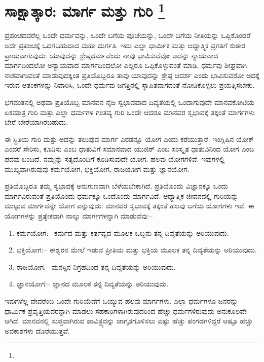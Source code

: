 
\chapter[ಸಾಕ್ಷಾತ್ಕಾರ: ಮಾರ್ಗ ಮತ್ತು ಗುರಿ ]{ಸಾಕ್ಷಾತ್ಕಾರ: ಮಾರ್ಗ ಮತ್ತು ಗುರಿ \protect\footnote{}}

ಪ್ರಪಂಚದವರೆಲ್ಲ ಒಂದೇ ಧರ್ಮವನ್ನು, ಒಂದೇ ಬಗೆಯ ಪೂಜೆಯನ್ನು, ಒಂದೇ ಬಗೆಯ ನೀತಿಯನ್ನು ಒಪ್ಪಿಕೊಂಡರೆ ಅದೇ ಪ್ರಪಂಚಕ್ಕೆ ಒದಗಬಹುದಾದ ಮಹಾ ದುರ್ಗತಿ. ಇದು ಎಲ್ಲಾ ಧಾರ್ಮಿಕ ಮತ್ತು ಆಧ್ಯಾತ್ಮಿಕ ಪ್ರಗತಿಗೆ ಕುಠಾರ ಪ್ರಾಯವಾಗುವುದು. ಯಾವುದನ್ನು ಶ್ರೇಷ್ಠಧರ್ಮವೆಂದು ನಾವು ಭಾವಿಸುವೆವೋ ಅದನ್ನು ನ್ಯಾಯವಾದ ಮಾರ್ಗದಿಂದಲೋ ಅನ್ಯಾಯವಾದ ಮಾರ್ಗದಿಂದಲೋ ಎಲ್ಲರೂ ಒಪ್ಪಿಕೊಳ್ಳುವಂತೆ ಮಾಡಿ, ಧರ್ಮವು ಶೀಘ್ರವಾಗಿ ನಾಶವಾಗುವಂತೆ ಮಾಡುವುದಕ್ಕಿಂತ ಪ್ರತಿಯೊಬ್ಬರೂ ತಾವು ಯಾವುದನ್ನು ಶ್ರೇಷ್ಠ ಆದರ್ಶ ಎಂದು ಭಾವಿಸುವರೋ ಅದಕ್ಕೆ ಇರುವ ಆತಂಕಗಳನ್ನು ನಿವಾರಿಸಿ, ಒಂದೇ ಧರ್ಮವು ಜಗತ್ತಿನಲ್ಲಿ ಸ್ಥಾಪಿತವಾಗದಂತೆ ನೋಡಿಕೊಳ್ಳಲು ಪ್ರಯತ್ನಿಸಬೇಕು.

ಭಗವಂತನಲ್ಲಿ ಅಥವಾ ಪ್ರತಿಯೊಬ್ಬ ಮಾನವನ ನೈಜ ಸ್ವಭಾವವಾದ ದಿವ್ಯತೆಯಲ್ಲಿ ಒಂದಾಗುವುದೇ ಮಾನವಕೋಟಿಯ ಏಕಮಾತ್ರ ಗುರಿ ಮತ್ತು ಎಲ್ಲಾ ಧರ್ಮಗಳ ಗಂತವ್ಯ ಗುರಿ ಒಂದೇ ಆದರೂ ಮಾನವರ ಸ್ವಭಾವಕ್ಕೆ ತಕ್ಕಂತೆ ಮಾರ್ಗಗಳು ಬೇರೆ ಬೇರೆಯಾಗಿರಬಹುದು.

ಈ ಸ್ಥಿತಿಯ ಗುರಿ ಮತ್ತು ಅದನ್ನು ತಲುಪುವ ಮಾರ್ಗ ಎರಡನ್ನೂ ಯೋಗ ಎಂದು ಕರೆಯುತ್ತಾರೆ. ಇಂಗ್ಲಿಷಿನ ಯೋಕ್​ ಎಂದರೆ ಸೇರಿಸು, ಕೂಡಿಸು ಎಂಬ ಧಾತುವಿಗೆ ಸಮಾನವಾದ ಯುಜಿರ್​ ಎಂಬ ಸಂಸ್ಕೃತ ಧಾತುವಿನಿಂದ ಯೋಗ ಎಂಬ ಪದವು ಬಂದಿದೆ. ನಮ್ಮನ್ನು ಸತ್ಯದೊಂದಿಗೆ ಕೂಡಿಸುವುದೇ ಯೋಗ. ಹಲವು ಯೋಗಗಳಿವೆ. ಇವುಗಳಲ್ಲಿ ಮುಖ್ಯವಾಗಿರುವುವು ಕರ್ಮಯೋಗ, ಭಕ್ತಿಯೋಗ, ರಾಜಯೋಗ ಮತ್ತು ಜ್ಞಾನಯೋಗ.

ಪ್ರತಿಯೊಬ್ಬರೂ ತಮ್ಮ ಸ್ವಭಾವಕ್ಕೆ ಅನುಗುಣವಾಗಿ ಬೆಳೆಯಬೇಕಾಗಿದೆ. ಪ್ರತಿಯೊಂದು ವಿಜ್ಞಾನಕ್ಕೂ ಒಂದು ಮಾರ್ಗವಿರುವಂತೆ ಪ್ರತಿಯೊಂದು ಧರ್ಮಕ್ಕೂ ಒಂದೊಂದು ಮಾರ್ಗವಿದೆ. ಆಧ್ಯಾತ್ಮಿಕ ಜೀವನದಲ್ಲಿ ಗುರಿಯನ್ನು ಮುಟ್ಟುವ ಮಾರ್ಗವನ್ನೇ ಯೋಗ ಎನ್ನುವುದು. ಮಾನವರ ಸ್ವಭಾವಕ್ಕೆ ತಕ್ಕಂತೆ ಹಲವು ಬಗೆಯ ಯೋಗಗಳು ಇವೆ. ಈ ಯೋಗಗಳನ್ನು ಪ್ರತ್ಯೇಕವಾಗಿ ನಾಲ್ಕು ಮಾರ್ಗಗಳನ್ನಾಗಿ ಮಾಡುವೆವು:–

\begin{enumerate}
\item ಕರ್ಮಯೋಗ:– ಕರ್ಮದ ಮತ್ತು ಕರ್ತವ್ಯದ ಮೂಲಕ ಒಬ್ಬನು ತನ್ನ ದಿವ್ಯತೆಯನ್ನು ಅರಿಯುವುದು.

 \item ಭಕ್ತಿಯೋಗ:– ಈಶ್ವರನ ಮೇಲೆ ಇಡುವ ಪ್ರೀತಿಯ ಮತ್ತು ಭಕ್ತಿಯ ಮೂಲಕ ತನ್ನ ದಿವ್ಯತೆಯನ್ನು ಅರಿಯುವುದು.

 \item ರಾಜಯೋಗ:– ಮನಸ್ಸಿನ ನಿಗ್ರಹದಿಂದ ತನ್ನ ದಿವ್ಯತೆಯನ್ನು ಅರಿಯುವುದು.

 \item ಜ್ಞಾನಯೋಗ:– ಜ್ಞಾನದ ಮೂಲಕ ತನ್ನ ದಿವ್ಯತೆಯನ್ನು ಅರಿಯುವುದು.

\end{enumerate}

ಇವುಗಳೆಲ್ಲ ದೇವರೆಂಬ ಒಂದೇ ಗುರಿಯೆಡೆಗೆ ಒಯ್ಯುವ ಹಲವು ಮಾರ್ಗಗಳು. ಎಲ್ಲಾ ಧರ್ಮಗಳೂ ಜನರನ್ನು ಧಾರ್ಮಿಕ ಪ್ರವೃತ್ತಿಯವರನ್ನಾಗಿ ಮಾಡಲು ಸಹಕಾರಿಗಳಾಗಿರುವುದರಿಂದ ಹೆಚ್ಚು ಧರ್ಮಗಳಿರುವುದು ಅನುಕೂಲವೇ ಆಗಿದೆ. ಮಾನವನಲ್ಲಿ ಸುಪ್ತವಾಗಿರುವ ಪಾವಿತ್ರ್ಯವನ್ನು ಜಾಗೃತಗೊಳಿಸಲು ಎಷ್ಟು ಹೆಚ್ಚು ಪಂಗಡಗಳಿದ್ದರೆ ಅಷ್ಟೂ ಹೆಚ್ಚು ಅವಕಾಶಗಳು ದೊರೆಯುತ್ತವೆ.

